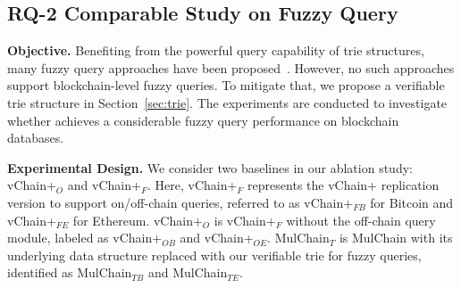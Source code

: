 \subsection{RQ-2 Comparable Study on Fuzzy Query}

\noindent
\textbf{Objective.}
Benefiting from the powerful query capability of trie structures, many fuzzy query approaches have been proposed~\cite{tahani1977conceptual,fagin1998fuzzy}.
However, no such approaches support blockchain-level fuzzy queries. 
To mitigate that, we propose a verifiable trie structure in Section~\ref{sec:trie}.
The experiments are conducted to investigate whether \Chain achieves a considerable fuzzy query performance on blockchain databases.


\noindent
\textbf{Experimental Design.}
We consider two baselines in our ablation study: 
vChain+$_{O}$ and vChain+$_{F}$.
Here, vChain+$_{F}$ represents the vChain+ replication version to support on/off-chain queries, referred to as vChain+$_{FB}$ for Bitcoin and vChain+$_{FE}$ for Ethereum.
vChain+$_{O}$ is vChain+$_{F}$ without the off-chain query module, labeled as vChain+$_{OB}$ and vChain+$_{OE}$.
MulChain$_{T}$ is MulChain with its underlying data structure replaced with our verifiable trie for fuzzy queries, identified as MulChain$_{TB}$ and MulChain$_{TE}$.







